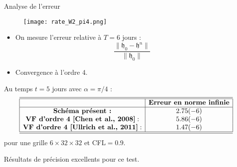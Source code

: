 \documentclass[11pt]{beamer}
\begin{document}

\begin{frame}{Analyse de l'erreur}
\begin{figure}
\texttt{[image: rate\_W2\_pi4.png]}
\end{figure}
\begin{itemize}
\item  On mesure l'erreur relative à $T=6$ jours  :
$$
\dfrac{\| \mathfrak{h}_0 - \mathfrak{h}^n \|}{\| \mathfrak{h}_0 \|}
$$
\item Convergence à l'ordre 4.
\end{itemize}
\end{frame}



\begin{frame}{}
Au temps $t = 5$ jours avec $\alpha = \pi/4$ :
\begin{equation*}
\begin{array}{|c|c|}
\hline
\hline
 & \textbf{Erreur en norme infinie} \\
\hline
 \textbf{Schéma présent :} & 2.75 (-6) \\
 \textbf{VF d'ordre 4 [Chen et al., 2008]} : & 5.86 (-6) \\
 \textbf{VF d'ordre 4 [Ullrich et al., 2011]} : & 1.47 (-6) \\
\hline
\hline
\end{array}
\end{equation*}
pour une grille $6 \times 32 \times 32$ et CFL$=0.9$.

\begin{block}{}
Résultats de précision excellents pour ce test.
\end{block}


\end{frame}


\end{document}
